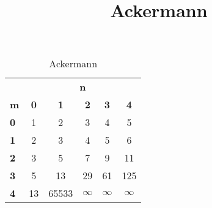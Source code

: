 
\title{Ackermann}


    \begin{table}
        \centering
        \begin{tabular}{l*{5}{c}}
            \toprule
            & \multicolumn{5}{c}{\textbf{n}} \\
            \cmidrule(lr){2-6}
            \textbf{m} & \textbf{0} & \textbf{1} & \textbf{2} & \textbf{3} & \textbf{4}\\
            \midrule
            \textbf{0} & 1  & 2     & 3  & 4  & 5   \\
            \textbf{1} & 2  & 3     & 4  & 5  & 6   \\
            \textbf{2} & 3  & 5     & 7  & 9  & 11  \\
            \textbf{3} & 5  & 13    & 29 & 61 & 125 \\
            \textbf{4} & 13 & 65533 & \textbf{$\infty$} & \textbf{$\infty$} & \textbf{$\infty$} \\
            \bottomrule
        \end{tabular}
        \caption{Ackermann}
        \label{table:1}
    \end{table}

